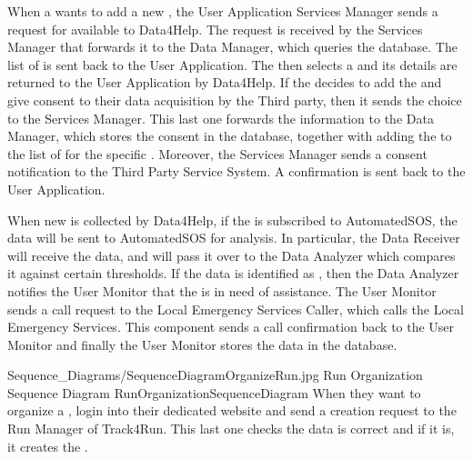 \documentclass[../../DD.tex]{subfiles}
\begin{document}
	When a  wants to add a new , the User Application Services Manager sends a request for available  to Data4Help. The request is received by the Services Manager that forwards it to the Data Manager, which queries the database. The list of  is sent back to the User Application. The  then selects a  and its details are returned to the User Application by Data4Help. If the  decides to add the  and give consent to their data acquisition by the Third party, then it sends the choice to the Services Manager. This last one forwards the information to the Data Manager, which stores the consent in the database, together with adding the  to the list of  for the specific . Moreover, the Services Manager sends a consent notification to the Third Party Service System. A confirmation is sent back to the User Application.



	When new  is collected by Data4Help, if the  is subscribed to AutomatedSOS, the data will be sent to AutomatedSOS for analysis. In particular, the Data Receiver will receive the data, and will pass it over to the Data Analyzer which compares it against certain thresholds. If the data is identified as , then the Data Analyzer notifies the User Monitor that the  is in need of assistance. The User Monitor sends a call request to the Local Emergency Services Caller, which calls the Local Emergency Services. This component sends a call confirmation back to the User Monitor and finally the User Monitor stores the  data in the database.
	

	\image {13cm} {Sequence_Diagrams/SequenceDiagramOrganizeRun.jpg} {Run Organization Sequence Diagram} {RunOrganizationSequenceDiagram}
	When they want to organize a ,  login into their dedicated website and send a  creation request to the Run Manager of Track4Run. This last one checks the  data is correct and if it is, it creates the .
\end{document}
